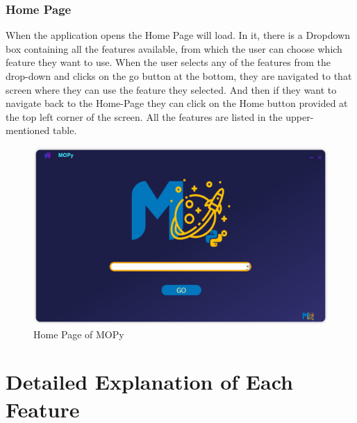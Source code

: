 \documentclass[12pt]{article}
\begin{document}
\subsubsection{Home Page}
When the application opens the Home Page will load. In it, there is a Dropdown box containing all the features available, from which the user can choose which feature they want to use. When the user selects any of the features from the drop-down and clicks on the go button at the bottom, they are navigated to that screen where they can use the feature they selected. And then if they want to navigate back to the Home-Page they can click on the Home button provided at the top left corner of the screen. All the features are listed in the upper-mentioned table.
\begin{figure}[H]
\centering
\includegraphics[scale=0.7]{homepage.png}
\caption{Home Page of MOPy} \label{home}
\end{figure}
\section{Detailed Explanation of Each Feature}
\end{document}
